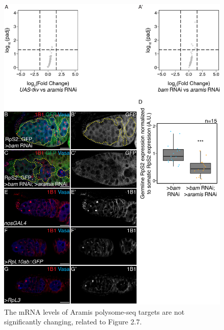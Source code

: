 \documentclass[12pt,oneside]{reedthesis}
\begin{document}
\begin{figure}

{\centering \includegraphics[width=6.5 in,height=8.9375 in]{./figure/Ribosome Biogenesis/Ribosome Biogenesis 4S} 

}

\caption[The mRNA levels of Aramis polysome-seq targets are not significantly changing, related to Figure 2.7.]{The mRNA levels of Aramis polysome-seq targets are not significantly changing, related to Figure 2.7.}\label{fig:unnamed-chunk-13}
\end{figure}
\textbf{\hfill\break
}
\end{document}
